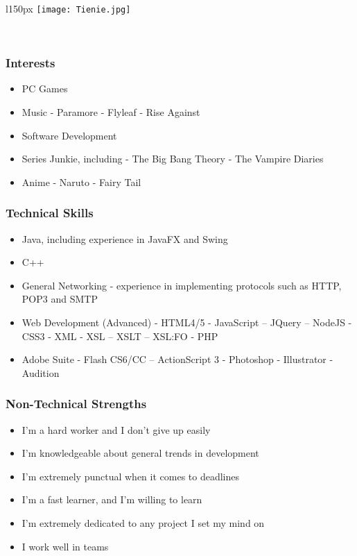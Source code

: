\begin{wrapfigure}[7]{l}{150px}
\vspace{10pt}
\texttt{[image: Tienie.jpg]}
\end{wrapfigure}

\textcolor{white}{.}
\subsubsection{Interests}
\begin{itemize}
	\item{PC Games}
	\item{Music}
		\subitem- Paramore
		\subitem- Flyleaf
		\subitem- Rise Against
	\item{Software Development}
	\item{Series Junkie, including}
		\subitem- The Big Bang Theory
		\subitem- The Vampire Diaries
	\item{Anime}
		\subitem- Naruto
		\subitem- Fairy Tail
\end{itemize}
\subsubsection{Technical Skills}
\begin{itemize}
	\item{Java, including experience in JavaFX and Swing}
	\item{C++}
	\item{General Networking - experience in implementing protocols such as HTTP, POP3 and SMTP}
	\item{Web Development (Advanced)}
		\subitem- HTML4/5
		\subitem- JavaScript
			\subsubitem-- JQuery
			\subsubitem-- NodeJS
		\subitem- CSS3
		\subitem- XML
		\subitem- XSL
			\subsubitem-- XSLT
			\subsubitem-- XSL:FO
		\subitem- PHP
	\item Adobe Suite
		\subitem- Flash CS6/CC
			\subsubitem-- ActionScript 3
		\subitem- Photoshop
		\subitem- Illustrator
		\subitem- Audition
		
\end{itemize}

\subsubsection{Non-Technical Strengths}
\begin{itemize}
	\item{I'm a hard worker and I don't give up easily}
	\item{I'm knowledgeable about general trends in development}
	\item{I'm extremely punctual when it comes to deadlines}
	\item{I'm a fast learner, and I'm willing to learn}
	\item{I'm extremely dedicated to any project I set my mind on}
	\item{I work well in teams}
\end{itemize}